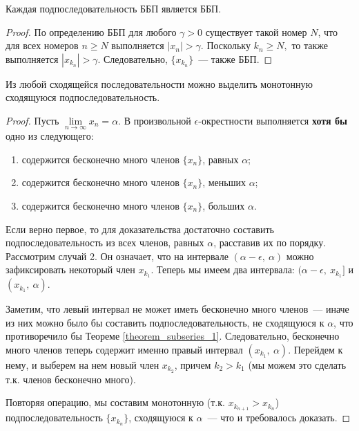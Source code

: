 \begin{theorem} \label{theorem_BBP_series}
Каждая подпоследовательность ББП является ББП.

\begin{proof}
По определению ББП для любого \(\gamma > 0\) существует
такой номер \(N\), что для всех номеров \(n \geq N\) выполняется \(|x_{n}| > \gamma\).
Поскольку \(k_{n} \geq N,\) то также выполняется \(|x_{k_{n}}| > \gamma\).
Следовательно, \(\{x_{k_{n}}\}\)~--- также ББП.
\end{proof}
\end{theorem}

\begin{theorem}
Из любой сходящейся последовательности можно выделить
монотонную сходящуюся подпоследовательность.

\begin{proof}
Пусть \(\lim\limits_{n \to \infty}{x_{n}} = \alpha\).
В произвольной \(\epsilon\)-окрестности выполняется \textbf{хотя бы}
одно из следующего:\\
\begin{enumerate}
\item содержится бесконечно много членов \(\{x_{n}\}\), равных \(\alpha\);
\item содержится бесконечно много членов \(\{x_{n}\}\), меньших \(\alpha\);
\item содержится бесконечно много членов \(\{x_{n}\}\), больших \(\alpha\).
\end{enumerate}

Если верно первое, то для доказательства достаточно составить подпоследовательность
из всех членов, равных \(\alpha\), расставив их по порядку. \\
Рассмотрим случай 2. Он означает, что на интервале \((\alpha - \epsilon, ~ \alpha)\)
можно зафиксировать некоторый член \(x_{k_{1}}\). Теперь мы имеем два интервала:
\((\alpha - \epsilon, ~ x_{k_{1}}]\) и \((x_{k_{1}}, ~ \alpha)\).

Заметим, что левый интервал не может иметь бесконечно много членов~--- иначе из них можно было
бы составить подпоследовательность, не сходящуюся к \(\alpha\), что противоречило
бы Теореме \ref{theorem_subseries_1}. Следовательно, бесконечно много членов теперь содержит именно
правый интервал \((x_{k_{1}}, ~ \alpha)\). Перейдем к нему, и выберем на нем новый член
\(x_{k_{2}}\), причем \(k_{2} > k_{1}\) (мы можем это сделать т.к. членов бесконечно много).

Повторяя операцию, мы составим монотонную (т.к. \(x_{k_{n+1}} > x_{k_{n}}\))
подпоследовательность \(\{x_{k_{n}}\}\), сходящуюся к \(\alpha\)~---
что и требовалось доказать.
\end{proof}
\end{theorem}

